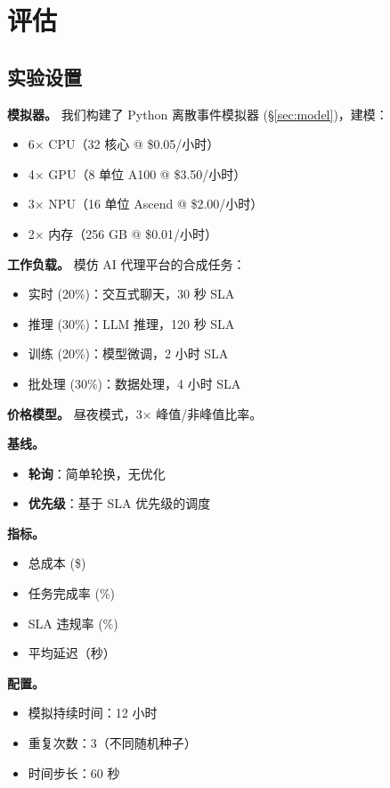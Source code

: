 \documentclass[10pt,a4paper]{article}
\begin{document}
\section{评估}
\label{sec:evaluation}

\subsection{实验设置}

\textbf{模拟器。} 我们构建了 Python 离散事件模拟器 (\S\ref{sec:model})，建模：
\begin{itemize}
    \item 6$\times$ CPU（32 核心 @ \$0.05/小时）
    \item 4$\times$ GPU（8 单位 A100 @ \$3.50/小时）
    \item 3$\times$ NPU（16 单位 Ascend @ \$2.00/小时）
    \item 2$\times$ 内存（256 GB @ \$0.01/小时）
\end{itemize}

\textbf{工作负载。} 模仿 AI 代理平台的合成任务：
\begin{itemize}
    \item 实时 (20\%)：交互式聊天，30 秒 SLA
    \item 推理 (30\%)：LLM 推理，120 秒 SLA
    \item 训练 (20\%)：模型微调，2 小时 SLA
    \item 批处理 (30\%)：数据处理，4 小时 SLA
\end{itemize}

\textbf{价格模型。} 昼夜模式，3$\times$ 峰值/非峰值比率。

\textbf{基线。}
\begin{itemize}
    \item \textbf{轮询}：简单轮换，无优化
    \item \textbf{优先级}：基于 SLA 优先级的调度
\end{itemize}

\textbf{指标。}
\begin{itemize}
    \item 总成本 (\$)
    \item 任务完成率 (\%)
    \item SLA 违规率 (\%)
    \item 平均延迟（秒）
\end{itemize}

\textbf{配置。}
\begin{itemize}
    \item 模拟持续时间：12 小时
    \item 重复次数：3（不同随机种子）
    \item 时间步长：60 秒
\end{itemize}
\end{document}
